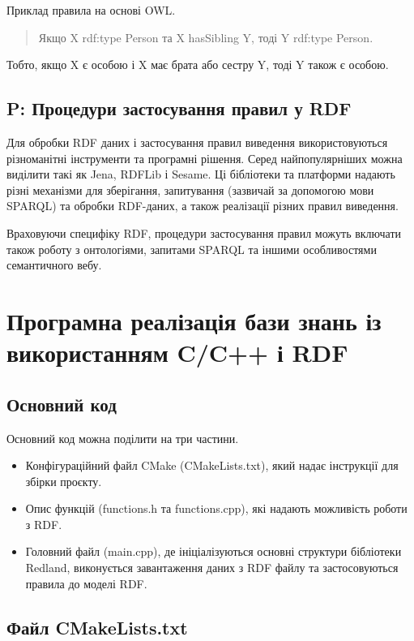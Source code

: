 \documentclass[12pt, a4paper]{article}
\begin{document}
Приклад правила на основі OWL.

\begin{quote}
Якщо X rdf:type Person та X hasSibling Y, тоді Y rdf:type Person.
\end{quote}

Тобто, якщо X є особою і X має брата або сестру Y, тоді Y також є особою.

\subsection{P: Процедури застосування правил у RDF}

Для обробки RDF даних і застосування правил виведення використовуються різноманітні інструменти та програмні рішення. Серед найпопулярніших можна виділити такі як Jena, RDFLib і Sesame. Ці бібліотеки та платформи надають різні механізми для зберігання, запитування (зазвичай за допомогою мови SPARQL) та обробки RDF-даних, а також реалізації різних правил виведення.

Враховуючи специфіку RDF, процедури застосування правил можуть включати також роботу з онтологіями, запитами SPARQL та іншими особливостями семантичного вебу.

\section{Програмна реалізація бази знань із використанням C/C++ і RDF}

\subsection{Основний код}

Основний код можна поділити на три частини.

\begin{itemize}
    \item Конфігураційний файл CMake (CMakeLists.txt), який надає інструкції для збірки проєкту.
    \item Опис функцій (functions.h та functions.cpp), які надають можливість роботи з RDF.
    \item Головний файл (main.cpp), де ініціалізуються основні структури бібліотеки Redland, виконується завантаження даних з RDF файлу та застосовуються правила до моделі RDF.
\end{itemize}

\subsection{Файл CMakeLists.txt}
\end{document}
